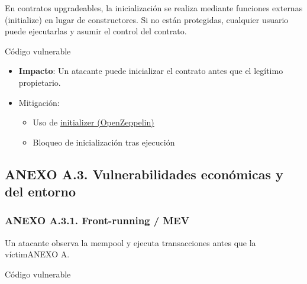 En contratos upgradeables, la inicialización se realiza mediante
funciones externas (initialize) en lugar de constructores. Si no están
protegidas, cualquier usuario puede ejecutarlas y asumir el control del
contrato.

Código vulnerable

\begin{Shaded}
\begin{Highlighting}[]
 \NormalTok{ \{}

\OperatorTok{=}\OperatorTok{;}

\NormalTok{\}}
\end{Highlighting}
\end{Shaded}

\begin{itemize}
\tightlist
\item
  \textbf{Impacto}: Un atacante puede inicializar el contrato antes que
  el legítimo propietario.
\item
  Mitigación:

  \begin{itemize}
  \tightlist
  \item
    Uso de
    \href{https://docs.openzeppelin.com/upgrades-plugins/writing-upgradeable}{initializer
    (OpenZeppelin)}
  \item
    Bloqueo de inicialización tras ejecución
  \end{itemize}
\end{itemize}

\subsection{ANEXO A.3. Vulnerabilidades económicas y del
entorno}\label{anexo-a.3.-vulnerabilidades-econuxf3micas-y-del-entorno}

\subsubsection{ANEXO A.3.1. Front-running /
MEV}\label{anexo-a.3.1.-front-running-mev}

Un atacante observa la mempool y ejecuta transacciones antes que la
víctimANEXO A.

Código vulnerable

\begin{Shaded}
\begin{Highlighting}[]
 \NormalTok{ \{}

    \OperatorTok{==}\OperatorTok{;}


\NormalTok{\}}
\end{Highlighting}
\end{Shaded}

